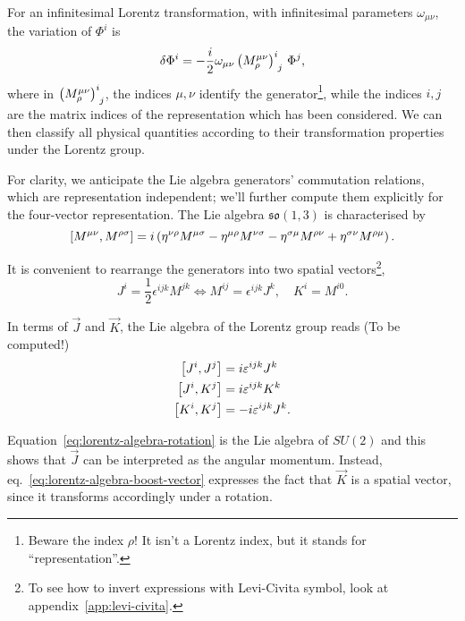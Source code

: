 For an infinitesimal Lorentz transformation, with infinitesimal parameters $\omega_{\mu\nu}$, the variation of $\Phi^i$ is
\begin{equation}\label{eq:action-lorentz-transf}
    \delta \Phi^i = -\frac{i}{2} \omega_{\mu\nu} \tensor{\left(  M^{\mu\nu}_\rho \right)}{^i_j} \, \Phi^j, 
\end{equation}
where in $\tensor{\left(  M^{\mu\nu}_\rho \right)}{^i_j}$, the indices $\mu,\nu$ identify the generator\footnote{Beware the index $\rho$! It isn't a Lorentz index, but it stands for “representation”.}, while the indices $i,j$ are the matrix indices of the representation which has been considered. We can then classify all physical quantities according to their transformation properties under the Lorentz group.

For clarity, we anticipate the Lie algebra generators' commutation relations, which are representation independent; we'll further compute them explicitly for the four-vector representation. The Lie algebra $\mathfrak{so}(1,3)$ is characterised by
\begin{equation}\label{eq:lorentz-algebra-relations}
    \comm{M^{\mu\nu}}{M^{\rho\sigma}} = i \left( \eta^{\nu\rho} M^{\mu\sigma} - \eta^{\mu\rho} M^{\nu\sigma} - \eta^{\sigma\mu} M^{\rho\nu} + \eta^{\sigma\nu} M^{\rho\mu} \right).
\end{equation}

It is convenient to rearrange the generators into two spatial vectors\footnote{To see how to invert expressions with Levi-Civita symbol, look at appendix~\ref{app:levi-civita}.},
\begin{equation}\label{eq:redef-lorentz-gen}
    J^i = \frac{1}{2} \epsilon^{ijk} M^{jk} \iff M^{ij} = \epsilon^{ijk} J^k, \quad K^i = M^{i0} .
\end{equation}

In terms of $\vec{J}$ and $\vec{K}$, the Lie algebra of the Lorentz group reads (\color{red}To be computed!\color{black})
\begin{subequations}
\begin{align}
    \comm{J^i}{J^j} &= i \epsilon^{ijk} J^k \label{eq:lorentz-algebra-rotation} \\ 
    \comm{J^i}{K^j} &= i \epsilon^{ijk} K^k \label{eq:lorentz-algebra-boost-vector} \\ 
    \comm{K^i}{K^j} &= -i \epsilon^{ijk} J^k .
\end{align}
\end{subequations}

Equation~\eqref{eq:lorentz-algebra-rotation} is the Lie algebra of $SU(2)$ and this shows that $\vec{J}$ can be interpreted as the angular momentum. Instead, eq.~\eqref{eq:lorentz-algebra-boost-vector} expresses the fact that $\vec{K}$ is a spatial vector, since it transforms accordingly under a rotation. 

